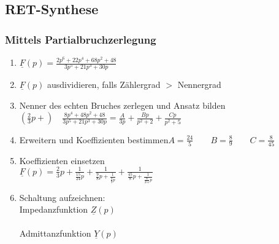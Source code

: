 \subsection{RET-Synthese}
\begin{multicols}{2}
\subsubsection{Mittels Partialbruchzerlegung}
	\begin{enumerate}
	  \item $\underline{F}(p)=\frac{2p^6+22p^4+68p^2+48}{3p^5+21p^3+30p}$
	  \item $\underline{F}(p)$ ausdividieren, falls Zählergrad $>$ Nennergrad
	  \item Nenner des echten Bruches zerlegen und Ansatz bilden
	  $(\frac{2}{3}p+)
	  \quad\frac{8p^4+48p^2+48}{3p^5+21p^3+30p}=\frac{A}{3p}+\frac{Bp}{p^2+2}+\frac{Cp}{p^2+5}$
		\item Erweitern und Koeffizienten bestimmen\newline $A=\frac{24}{5} \qquad
		B=\frac{8}{9} \qquad C=\frac{8}{45}$
		\item Koeffizienten einsetzen\\
		$\underline{F}(p)=\frac{2}{3}p+\frac{1}{\frac{15}{24}p}+\frac{1}{\frac{9}{8}p+\frac{1}{\frac{4}{9}p}}+\frac{1}{\frac{45}{8}p+\frac{1}{\frac{8}{255}p}}$
		\item Schaltung aufzeichnen:\\
			Impedanzfunktion $\underline{Z}(p)$\\
			\hspace*{0.5cm}\scalebox{0.6}{}\\
			Admittanzfunktion $\underline{Y}(p)$\\
			\hspace*{0.5cm}\scalebox{0.55}{}	  
	\end{enumerate}
	

\end{multicols}
